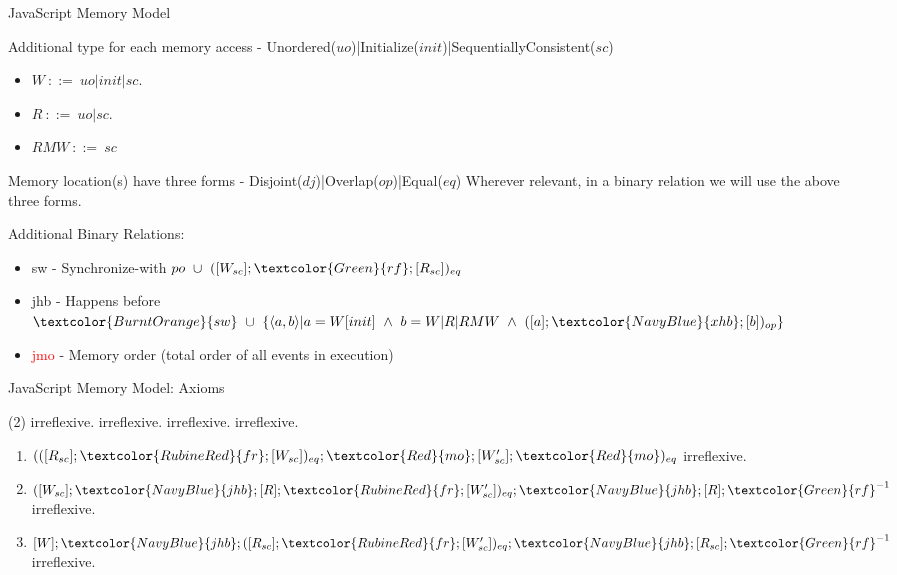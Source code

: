 \documentclass[xcolor={dvipsnames}, notes]{beamer}
\newcommand{\rf}{\textcolor{Green}{rf}}
\newcommand{\mo}{\textcolor{Red}{mo}}
\newcommand{\fr}{\textcolor{RubineRed}{fr}}
\newcommand{\xhb}{\textcolor{NavyBlue}{xhb}}
\newcommand{\sw}{\textcolor{BurntOrange}{sw}}
\newcommand{\jhb}{\textcolor{NavyBlue}{jhb}}
\newcommand{\jmo}{\textcolor{Red}{jmo}}
\begin{document}
    \begin{frame}{JavaScript Memory Model}
        
        Additional type for each memory access - Unordered($uo$)|Initialize($init$)|SequentiallyConsistent($sc$)
        \begin{itemize}
            \item $W \ ::= \ uo|init|sc $.
            \item $R \ ::= \ uo|sc $.
            \item $RMW \ ::= \ sc$
        \end{itemize}

        Memory location(s) have three forms - Disjoint($dj$)|Overlap($op$)|Equal($eq$)
        Wherever relevant, in a binary relation we will use the above three forms.
        
        Additional Binary Relations:
        \begin{itemize}
            \item {\sw} - Synchronize-with $po \ \cup \ ([W_{sc}];\rf;[R_{sc}])_{eq}$
            \item {\jhb} - Happens before $\sw \ \cup \ \{\langle a,b \rangle | a = W[init] \ \wedge \ b=W|R|RMW \ \wedge \ ([a];\xhb;[b])_{op} \}$
            \item {\jmo} - Memory order (total order of all events in execution) 
        \end{itemize}

        
    \end{frame}

    \begin{frame}{JavaScript Memory Model: Axioms}
        
        \begin{tasks}(2)
            \task {\jhb} irreflexive.
            \task {\jhb;\jmo} irreflexive.
            \task {\jhb;\rf} irreflexive.
            \task {$(\fr;\xhb)_{op}$} irreflexive.
        \end{tasks}

        \begin{enumerate}
            \item {$(([R_{sc}];\fr;[W_{sc}])_{eq};\mo;[W'_{sc}];\mo)_{eq}$} irreflexive.
            \item {$([W_{sc}];\jhb;[R];\fr;[W'_{sc}])_{eq};\jhb;[R];\rf^{-1}$} irreflexive. %
            \item {$[W];\jhb;([R_{sc}];\fr;[W'_{sc}])_{eq};\jhb;[R_{sc}];\rf^{-1}$} irreflexive.
        \end{enumerate}
    \end{frame}
\end{document}
